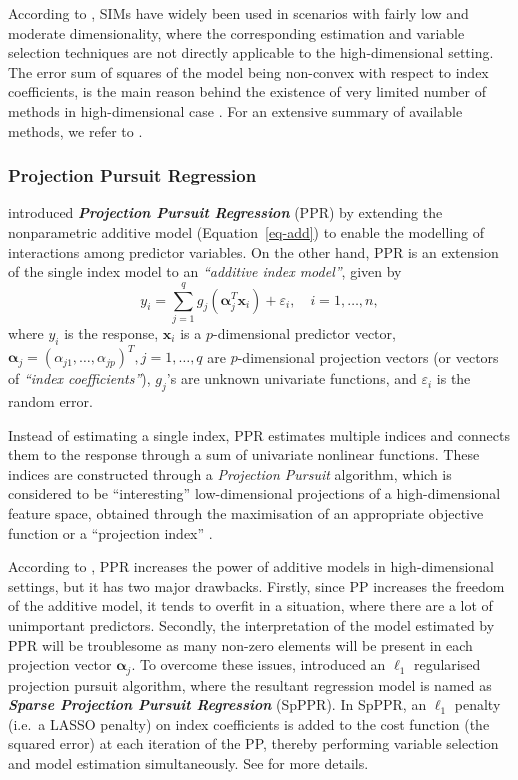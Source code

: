 \documentclass[11pt,a4paper,]{article}
\begin{document}
According to \textcite{Radchenko2015}, SIMs have widely been used in
scenarios with fairly low and moderate dimensionality, where the
corresponding estimation and variable selection techniques are not
directly applicable to the high-dimensional setting. The error sum of
squares of the model being non-convex with respect to index
coefficients, is the main reason behind the existence of very limited
number of methods in high-dimensional case \autocite{Radchenko2015}. For
an extensive summary of available methods, we refer to
\textcite{Radchenko2015}.

\hypertarget{projection-pursuit-regression}{%
\subsubsection{Projection Pursuit
Regression}\label{projection-pursuit-regression}}

\textcite{Friedman1981} introduced \textbf{\emph{Projection Pursuit
Regression}} (PPR) by extending the nonparametric additive model
(Equation~\ref{eq-add}) to enable the modelling of interactions among
predictor variables. On the other hand, PPR is an extension of the
single index model to an \emph{``additive index model''}, given by \[
  y_{i} = \sum_{j=1}^{q} {g_{j}(\bm{\alpha}_{j}^{T}\bm{x}_{i})} + \varepsilon_{i}, \quad i = 1, \dots, n,
\] where \(y_{i}\) is the response, \(\bm{x}_{i}\) is a
\(p\)-dimensional predictor vector,
\(\bm{\alpha}_{j} = \left ( \alpha_{j1}, \dots, \alpha_{jp} \right )^{T}, j = 1, \dots, q\)
are \(p\)-dimensional projection vectors (or vectors of \emph{``index
coefficients''}), \(g_{j}\)'s are unknown univariate functions, and
\(\varepsilon_{i}\) is the random error.

Instead of estimating a single index, PPR estimates multiple indices and
connects them to the response through a sum of univariate nonlinear
functions. These indices are constructed through a \emph{Projection
Pursuit} \autocites[PP,][]{Kruskal1969,Friedman1974} algorithm, which is
considered to be ``interesting'' low-dimensional projections of a
high-dimensional feature space, obtained through the maximisation of an
appropriate objective function or a ``projection index''
\autocite{Huber1985}.

According to \textcite{Zhang2008}, PPR increases the power of additive
models in high-dimensional settings, but it has two major drawbacks.
Firstly, since PP increases the freedom of the additive model, it tends
to overfit in a situation, where there are a lot of unimportant
predictors. Secondly, the interpretation of the model estimated by PPR
will be troublesome as many non-zero elements will be present in each
projection vector \(\bm{\alpha}_{j}\). To overcome these issues,
\textcite{Zhang2008} introduced an \(\ell_{1}\) regularised projection
pursuit algorithm, where the resultant regression model is named as
\textbf{\emph{Sparse Projection Pursuit Regression}} (SpPPR). In SpPPR,
an \(\ell_{1}\) penalty (i.e.~a LASSO penalty) on index coefficients is
added to the cost function (the squared error) at each iteration of the
PP, thereby performing variable selection and model estimation
simultaneously. See \textcite{Zhang2008} for more details.
\end{document}
